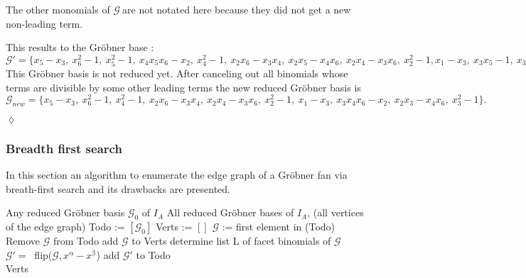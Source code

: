 \begin{env_example}
The other monomials of $\mathcal{G}~$are not notated here because they did not get a new non-leading term.

This results to the Gröbner base : \\
$\mathcal{G}' = \{x_{5}-x_{3},~x_{6}^{2}-1,~x_{5}^{2}-1,~x_{4}x_{5}x_{6}-x_{2},~x_{4}^{2}-1,~ x_{2}x_{6}-x_{3}x_{4},~x_{2}x_{5}-x_{4}x_{6},~x_{2}x_{4}-x_{3}x_{6} ,~x_{2}^{2}-1,x_{1}-x_{3},~x_{3}x_{5}-1,~x_{3}x_{4}x_{6}-x_{2},~x_{2}x_{3}-x_{4}x_{6},~x_{3}^{2}-1 \}.$ \\
This Gröbner basis is not reduced yet. After canceling out all binomials whose terms are divisible by some other leading terms the new reduced Gröbner basis is 
$\mathcal{G}_{new} = \{x_{5}-x_{3},~x_{6}^{2}-1,~x_{4}^{2}-1,~x_{2}x_{6}-x_{3}x_{4},~x_{2}x_{4}-x_{3}x_{6},~x_{2}^{2}-1,~x_{1}-x_{3},~x_{3}x_{4}x_{6}-x_{2},~x_{2}x_{3}-x_{4}x_{6},~x_{3}^{2}-1 \}.$

\begin{flushright}
$\lozenge$
\end{flushright}
\end{env_example}


\subsubsection{Breadth first search}

In this section an algorithm to enumerate the edge graph of a Gröbner fan via breath-first search and its drawbacks are presented.

\begin{algorithm}
\caption{Enumerating the edge graph of the Gröbner fan via breath-first search \cite{tigers}}
\label{alg:breath}
\begin{algorithmic}[1]

\Input
Any reduced Gröbner basis $ \mathcal{G}_0 $ of $I_A$
\Output All reduced Gröbner bases of $I_A$, (all vertices of the edge graph)
\State Todo := $\left[ \mathcal{G}_0 \right]  $
\State Verts := $\left[ \right] $
\State $\mathcal{G}$ := first element in (Todo)
\State Remove $\mathcal{G} $ from Todo
\State add $\mathcal{G}$ to Verts 
\State determine list L of facet binomials of $\mathcal{G} $
 \State $\mathcal{G}' =~$ flip($\mathcal{G},x^{\upalpha} - x^{\upbeta} $)
 \State add $\mathcal{G}'$ to Todo
 \EndIf
 \EndFor
\EndWhile \\
\Return Verts

\end{algorithmic}
\end{algorithm}

